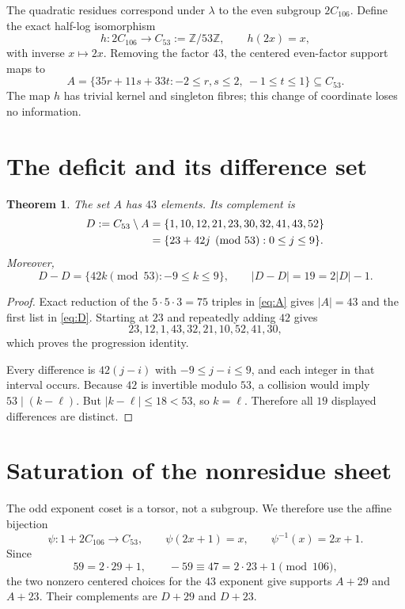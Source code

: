 \documentclass[11pt]{article}
\newtheorem{theorem}{Theorem}
\begin{document}
The quadratic residues correspond under $\lambda$ to the even subgroup
$2C_{106}$.  Define the exact half-log isomorphism
\[
h:2C_{106}\longrightarrow C_{53}:=\mathbb Z/53\mathbb Z,
\qquad h(2x)=x,
\]
with inverse $x\mapsto2x$.  Removing the factor $43$, the centered
even-factor support maps to
\begin{equation}
A=\{35r+11s+33t:-2\leq r,s\leq2,\ -1\leq t\leq1\}
\subseteq C_{53}.
\label{eq:A}
\end{equation}
The map $h$ has trivial kernel and singleton fibres; this change of coordinate
loses no information.

\section{The deficit and its difference set}

\begin{theorem}
The set $A$ has $43$ elements.  Its complement is
\begin{align}
D:=C_{53}\setminus A
 &=\{1,10,12,21,23,30,32,41,43,52\}\notag\\
 &=\{23+42j\pmod{53}:0\leq j\leq9\}.
\label{eq:D}
\end{align}
Moreover,
\begin{equation}
D-D=\{42k\pmod{53}:-9\leq k\leq9\},
\qquad |D-D|=19=2|D|-1.
\label{eq:DD}
\end{equation}
\end{theorem}

\begin{proof}
Exact reduction of the $5\cdot5\cdot3=75$ triples in \eqref{eq:A} gives
$|A|=43$ and the first list in \eqref{eq:D}.  Starting at $23$ and repeatedly
adding $42$ gives
\[
23,12,1,43,32,21,10,52,41,30,
\]
which proves the progression identity.

Every difference is $42(j-i)$ with $-9\leq j-i\leq9$, and each integer in
that interval occurs.  Because $42$ is invertible modulo $53$, a collision
would imply $53\mid(k-\ell)$.  But $|k-\ell|\leq18<53$, so $k=\ell$.
Therefore all $19$ displayed differences are distinct.
\end{proof}

\section{Saturation of the nonresidue sheet}

The odd exponent coset is a torsor, not a subgroup.  We therefore use the
affine bijection
\[
\psi:1+2C_{106}\longrightarrow C_{53},
\qquad \psi(2x+1)=x,
\qquad \psi^{-1}(x)=2x+1.
\]
Since
\[
59=2\cdot29+1,
\qquad -59\equiv47=2\cdot23+1\pmod{106},
\]
the two nonzero centered choices for the $43$ exponent give supports
$A+29$ and $A+23$.  Their complements are $D+29$ and $D+23$.
\end{document}
